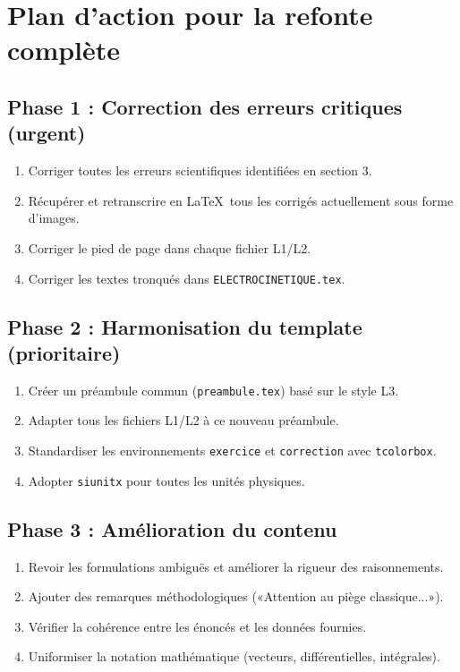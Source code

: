 \documentclass[12pt,a4paper]{article}
\newcommand{\fichier}[1]{\texttt{\small\color{Purple}#1}}
\begin{document}
\section{Plan d'action pour la refonte complète}

\subsection{Phase 1 : Correction des erreurs critiques (urgent)}

\begin{enumerate}
  \item Corriger toutes les erreurs scientifiques identifiées en section 3.
  \item Récupérer et retranscrire en \LaTeX\ tous les corrigés actuellement sous forme d'images.
  \item Corriger le pied de page dans chaque fichier L1/L2.
  \item Corriger les textes tronqués dans \fichier{ELECTROCINETIQUE.tex}.
\end{enumerate}

\subsection{Phase 2 : Harmonisation du template (prioritaire)}

\begin{enumerate}
  \item Créer un préambule commun (\fichier{preambule.tex}) basé sur le style L3.
  \item Adapter tous les fichiers L1/L2 à ce nouveau préambule.
  \item Standardiser les environnements \verb|exercice| et \verb|correction| avec \verb|tcolorbox|.
  \item Adopter \verb|siunitx| pour toutes les unités physiques.
\end{enumerate}

\subsection{Phase 3 : Amélioration du contenu}

\begin{enumerate}
  \item Revoir les formulations ambiguës et améliorer la rigueur des raisonnements.
  \item Ajouter des remarques méthodologiques («Attention au piège classique...»).
  \item Vérifier la cohérence entre les énoncés et les données fournies.
  \item Uniformiser la notation mathématique (vecteurs, différentielles, intégrales).
\end{enumerate}
\end{document}
